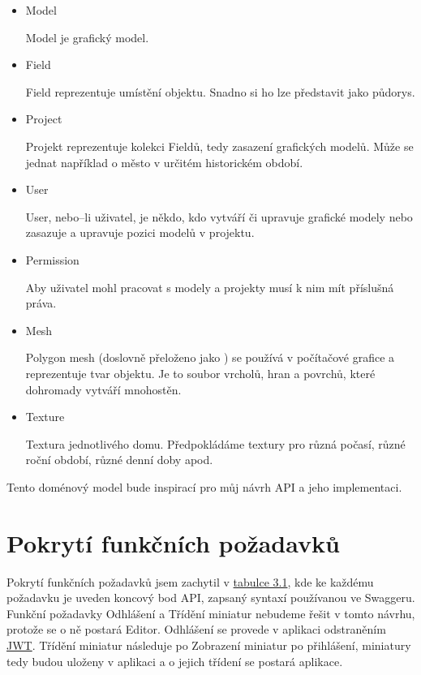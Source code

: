 \documentclass[thesis=B,czech]{FITthesis}[2012/06/26]
\begin{document}
        \begin{itemize}
            \item Model
            
            Model je grafický model.
            \item Field
            
            Field reprezentuje umístění objektu. Snadno si ho lze představit jako půdorys.
            \item Project
            
            Projekt reprezentuje kolekci Fieldů, tedy zasazení grafických modelů. Může se jednat například o město v určitém historickém období.
            \item User
            
            User, nebo--li uživatel, je někdo, kdo vytváří či upravuje grafické modely nebo zasazuje a upravuje pozici modelů v projektu.
            \item Permission
            
            Aby uživatel mohl pracovat s modely a projekty musí k nim mít příslušná práva.
            \item Mesh
            
            Polygon mesh (doslovně přeloženo jako ) se používá v počítačové grafice a reprezentuje tvar objektu. Je to soubor vrcholů, hran a povrchů, které dohromady vytváří mnohostěn.
            \item Texture
            
            Textura jednotlivého domu. Předpokládáme textury pro různá počasí, různé roční období, různé denní doby apod.
        \end{itemize}
        Tento doménový model bude inspirací pro můj návrh API a jeho implementaci.
    \section{Pokrytí funkčních požadavků}
        Pokrytí funkčních požadavků jsem zachytil v \hyperref[tab:tabulkaPokryti]{tabulce 3.1}, kde ke každému požadavku je uveden koncový bod API, zapsaný syntaxí používanou ve Swaggeru. Funkční požadavky Odhlášení a Třídění miniatur nebudeme řešit v tomto návrhu, protože se o ně postará Editor.
        Odhlášení se provede v aplikaci odstraněním \hyperref[sec:jwt]{JWT}.
        Třídění miniatur následuje po Zobrazení miniatur po přihlášení, miniatury tedy budou uloženy v aplikaci a o jejich třídení se postará aplikace.
    
\end{document}
